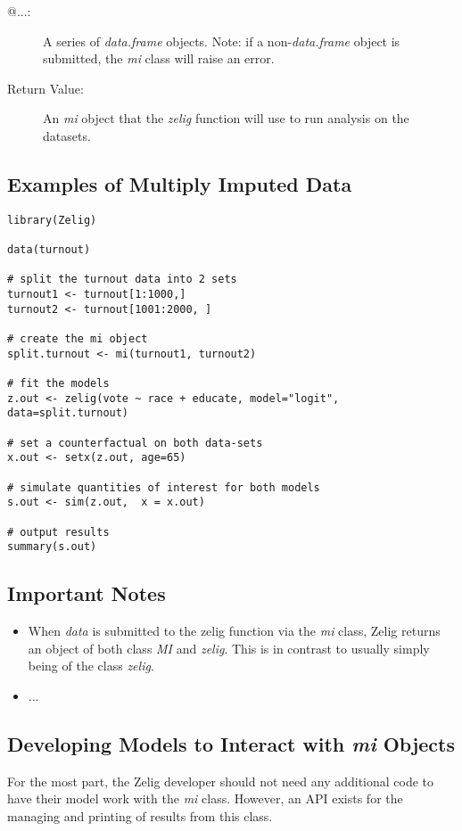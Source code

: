\documentclass[a4paper,11pt]{article}
\begin{document}
\begin{description}
	\item[@...:]{A series of \emph{data.frame} objects.  Note: if a non-\emph{data.frame} object is submitted, the \emph{mi} class will raise an error.}
	\item[Return Value:]{An \emph{mi} object that the \emph{zelig} function will use to run analysis on the datasets.}
\end{description}


\pagebreak
\subsection{Examples of Multiply Imputed Data}


\begin{lstlisting}
library(Zelig)

data(turnout)

# split the turnout data into 2 sets
turnout1 <- turnout[1:1000,]
turnout2 <- turnout[1001:2000, ]

# create the mi object
split.turnout <- mi(turnout1, turnout2)

# fit the models
z.out <- zelig(vote ~ race + educate, model="logit", data=split.turnout)

# set a counterfactual on both data-sets
x.out <- setx(z.out, age=65)

# simulate quantities of interest for both models
s.out <- sim(z.out,  x = x.out)

# output results
summary(s.out)
\end{lstlisting}

\vspace{4mm}

\subsection*{Important Notes}
\begin{itemize}
	\item{When \emph{data} is submitted to the zelig function via the \emph{mi} class, Zelig returns an object of both class \emph{MI} and \emph{zelig}.  This is in contrast to usually simply being of the class \emph{zelig}.}
	\item{...}
\end{itemize}

%
\subsection{Developing Models to Interact with \emph{mi} Objects}
For the most part, the Zelig developer should not need any additional code to have their model work with the \emph{mi} class.  However, an API exists for the managing and printing of results from this class.
\end{document}
